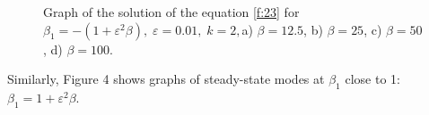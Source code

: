 \documentclass[12pt]{article} %
\newcommand{\eps}{\varepsilon}
\begin{document}
\begin{figure}[h!]
\begin{minipage}[h]{0.49\linewidth}
\end{minipage}
\begin{minipage}[h]{0.49\linewidth}
\end{minipage}
\caption{Graph of the solution of the equation \eqref{f:23} for $\beta_1=-(1+\eps^2\beta),\;\eps=0.01,\; k=2, $a) $\beta=12.5$, b) $\beta=25$, c) $\beta=50$, d) $\beta=100$.}%
\label{fig:4}
\end{figure}

Similarly, Figure 4 shows graphs of steady-state modes at $\beta_1$ close to 1: $\beta_1=1+\eps^2\beta$.
\end{document}
